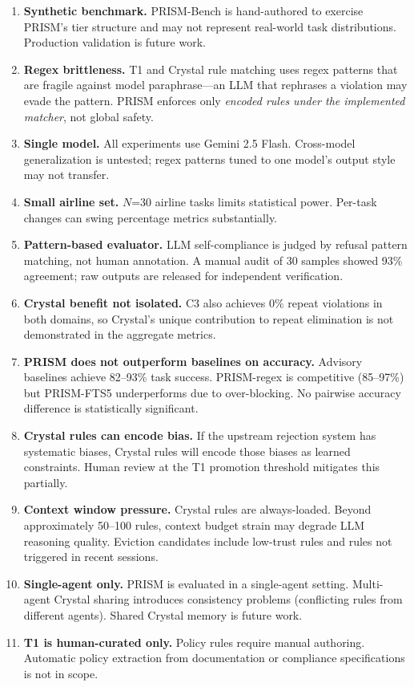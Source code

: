 \documentclass[11pt]{article}
\begin{document}
\begin{enumerate}
\item \textbf{Synthetic benchmark.}
PRISM-Bench is hand-authored to exercise PRISM's tier structure
and may not represent real-world task distributions.
Production validation is future work.

\item \textbf{Regex brittleness.}
T1 and Crystal rule matching uses regex patterns that are fragile
against model paraphrase---an LLM that rephrases a violation may evade the pattern.
PRISM enforces only \emph{encoded rules under the implemented matcher},
not global safety.

\item \textbf{Single model.}
All experiments use Gemini 2.5 Flash.
Cross-model generalization is untested; regex patterns tuned to one model's
output style may not transfer.

\item \textbf{Small airline set.}
$N$=30 airline tasks limits statistical power.
Per-task changes can swing percentage metrics substantially.

\item \textbf{Pattern-based evaluator.}
LLM self-compliance is judged by refusal pattern matching, not human annotation.
A manual audit of 30 samples showed 93\% agreement;
raw outputs are released for independent verification.

\item \textbf{Crystal benefit not isolated.}
C3 also achieves 0\% repeat violations in both domains,
so Crystal's unique contribution to repeat elimination is not demonstrated
in the aggregate metrics.

\item \textbf{PRISM does not outperform baselines on accuracy.}
Advisory baselines achieve 82--93\% task success.
PRISM-regex is competitive (85--97\%) but PRISM-FTS5 underperforms
due to over-blocking.
No pairwise accuracy difference is statistically significant.

\item \textbf{Crystal rules can encode bias.}
If the upstream rejection system has systematic biases,
Crystal rules will encode those biases as learned constraints.
Human review at the T1 promotion threshold mitigates this partially.

\item \textbf{Context window pressure.}
Crystal rules are always-loaded. Beyond approximately 50--100 rules,
context budget strain may degrade LLM reasoning quality.
Eviction candidates include low-trust rules and rules not triggered in recent sessions.

\item \textbf{Single-agent only.}
PRISM is evaluated in a single-agent setting. Multi-agent Crystal sharing
introduces consistency problems (conflicting rules from different agents).
Shared Crystal memory is future work.

\item \textbf{T1 is human-curated only.}
Policy rules require manual authoring. Automatic policy extraction
from documentation or compliance specifications is not in scope.
\end{enumerate}
\end{document}
